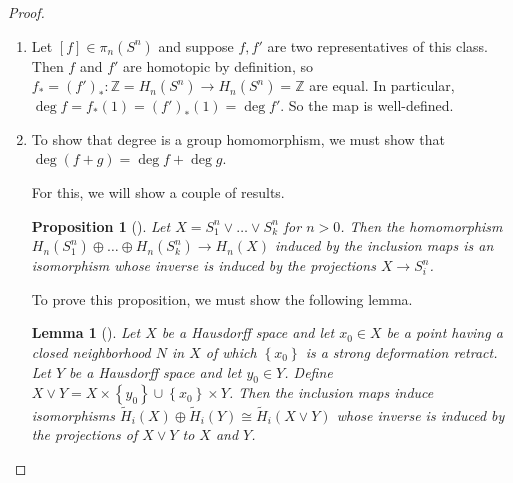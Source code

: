 \documentclass[reqno]{amsart}
\newtheorem{lemma}[theorem]{Lemma}
\newtheorem{proposition}[theorem]{Proposition}
\theoremstyle{definition}
\theoremstyle{remark}
\begin{document}
        \begin{proof}


        \begin{enumerate}
            \item Let
                $ \left[ f \right] 
                \in \pi_n \left( S^{n} \right) $ and
                suppose $f, f'$ are two representatives of
                this class. Then
                $f$ and $f'$ are homotopic by definition,
                so $f_* = \left( f' \right)_* \colon
                \mathbb{Z} = H_n\left( S^{n} \right) \to 
                H_n\left( S^{n} \right) = \mathbb{Z} $ are equal.
                In particular,
                $\deg f = f_*(1) = \left( f' \right)_* (1)
                = \deg f'$. So the map is well-defined.
            \item To show that degree is a group homomorphism,
                we must show that
                $\deg \left( f+g \right) = 
                \deg f + \deg g$.

                For this, we will show a couple of results.

                \begin{proposition}[]
                    Let $X = S_1^{n} \vee \ldots \vee
                    S_k^{n}$ for $n > 0$. Then
                    the homomorphism 
                    $H_n\left( S_1^{n} \right) \oplus \ldots
                    \oplus H_n\left( S_k^{n} \right) 
                    \to H_n(X)$ induced by the inclusion maps
                    is an isomorphism whose inverse
                    is induced by the projections
                    $X \to S_i^{n}$.
                \end{proposition}
                
                To prove this proposition, we must show the following
                lemma.

                \begin{lemma}[]
                    Let $X$ be a Hausdorff space and let
                    $x_0 \in X$ be a point having a closed
                    neighborhood $N$ in $X$ of which
                    $\left\{ x_0 \right\} $ is a strong deformation
                    retract. Let $Y$ be a Hausdorff space and
                    let $y_0 \in Y$. Define
                    $X \vee Y = X \times \left\{ y_0 \right\} 
                    \cup \left\{ x_0 \right\} \times Y$.
                    Then the inclusion maps induce
                    isomorphisms 
                    $\tilde{H}_i(X) \oplus \tilde{H}_i(Y)
                    \cong \tilde{H}_i\left( X \vee Y \right) $
                    whose inverse is induced by the projections
                    of $X \vee Y$ to $X$ and $Y$.
                \end{lemma}
                

\end{enumerate}
\end{proof}
\end{document}
